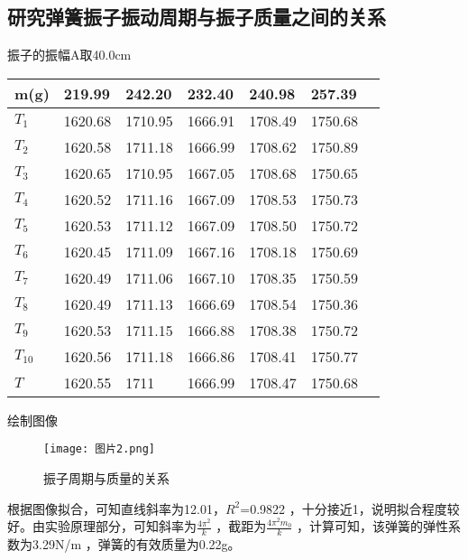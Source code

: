 \documentclass[11pt,a4paper]{article}
\begin{document}
    \subsection{研究弹簧振子振动周期与振子质量之间的关系}
    振子的振幅A取40.0cm
    \begin{table}[H]
        \centering
        \begin{tabular}{|l|l|l|l|l|l|l|}
        \hline
            m(g) & 219.99 & 242.20 & 232.40 & 240.98 & 257.39  \\ \hline
            $T_1$  & 1620.68 &1710.95&1666.91&1708.49&1750.68 \\ \hline
            $T_2$  & 1620.58 &1711.18&1666.99&1708.62&1750.89  \\ \hline
            $T_3$  & 1620.65 &1710.95&1667.05&1708.68&1750.65  \\ \hline
            $T_4$  & 1620.52 &1711.16&1667.09&1708.53&1750.73 \\ \hline
            $T_5$  &1620.53&1711.12&1667.09&1708.50&1750.72 \\ \hline
            $T_6$  &1620.45&1711.09&1667.16&1708.18&1750.69 \\ \hline
            $T_7$  &1620.49&1711.06&1667.10&1708.35&1750.59 \\ \hline
            $T_8$  &1620.49&1711.13&1666.69&1708.54&1750.36\\ \hline
            $T_9$  &1620.53&1711.15&1666.88&1708.38&1750.72 \\ \hline
            $T_{10}$ &1620.56&1711.18&1666.86&1708.41&1750.77   \\ \hline
            $T$    &1620.55&1711&1666.99&1708.47&1750.68 \\ \hline

        \end{tabular}
    \end{table}
    绘制图像
    \begin{figure}[H]
        \centering
        \texttt{[image: 图片2.png]}
        \caption{振子周期与质量的关系}
    \end{figure}
    根据图像拟合，可知直线斜率为12.01，$R^2$=0.9822 ，十分接近1，说明拟合程度较好。由实验原理部分，可知斜率为$\frac{4{\pi ^2}}{k} $ ，截距为$\frac{4{\pi ^2}m_0}{k}$ ，计算可知，该弹簧的弹性系数为3.29N/m ，弹簧的有效质量为0.22g。
\end{document}
